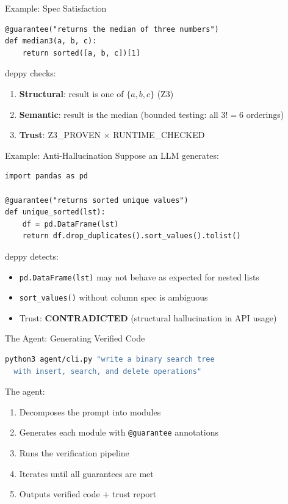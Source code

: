 \documentclass[aspectratio=169,11pt]{beamer}
\begin{document}
\begin{frame}{Example: Spec Satisfaction}
\begin{lstlisting}[language=deppy]
@guarantee("returns the median of three numbers")
def median3(a, b, c):
    return sorted([a, b, c])[1]
\end{lstlisting}

\vspace{0.5em}
deppy checks:
\begin{enumerate}
\item \textbf{Structural}: result is one of $\{a, b, c\}$ \checkmark (Z3)
\item \textbf{Semantic}: result is the median \checkmark (bounded testing: all $3! = 6$ orderings)
\item \textbf{Trust}: Z3\_PROVEN $\times$ RUNTIME\_CHECKED
\end{enumerate}
\end{frame}

\begin{frame}{Example: Anti-Hallucination}
Suppose an LLM generates:
\begin{lstlisting}[language=deppy, basicstyle=\small\ttfamily]
import pandas as pd

@guarantee("returns sorted unique values")
def unique_sorted(lst):
    df = pd.DataFrame(lst)
    return df.drop_duplicates().sort_values().tolist()
\end{lstlisting}

\vspace{0.3em}
deppy detects:
\begin{itemize}
\item \texttt{pd.DataFrame(lst)} may not behave as expected for nested lists
\item \texttt{sort\_values()} without column spec is ambiguous
\item Trust: \textbf{CONTRADICTED} (structural hallucination in API usage)
\end{itemize}
\end{frame}

\begin{frame}{The Agent: Generating Verified Code}
\begin{lstlisting}[language=bash, basicstyle=\small\ttfamily]
python3 agent/cli.py "write a binary search tree
  with insert, search, and delete operations"
\end{lstlisting}

\vspace{0.5em}
The agent:
\begin{enumerate}
\item Decomposes the prompt into modules
\item Generates each module with \texttt{@guarantee} annotations
\item Runs the verification pipeline
\item Iterates until all guarantees are met
\item Outputs verified code + trust report
\end{enumerate}
\end{frame}
\end{document}
